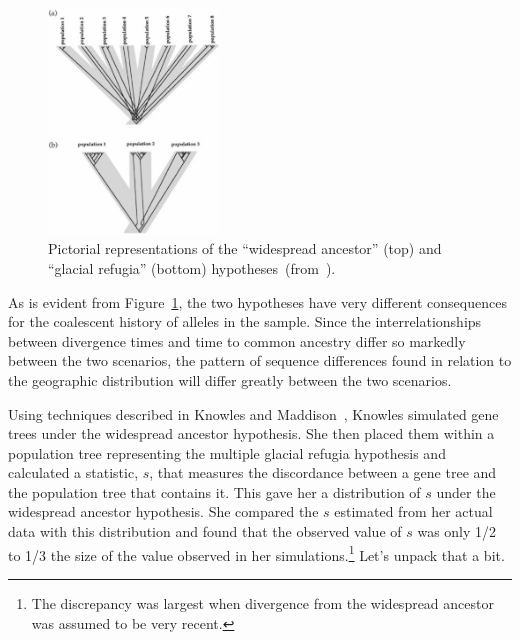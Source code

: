 \begin{figure}
\begin{center}
\includegraphics[height=6cm]{divergence-hypotheses.eps}
\end{center}
\caption{Pictorial representations of the ``widespread ancestor''
  (top) and ``glacial refugia'' (bottom)
  hypotheses~(from~\cite{Knowles-2001}).}\label{fig:divergence-hypotheses}
\end{figure}

As is evident from Figure~\ref{fig:divergence-hypotheses}, the two
hypotheses have very different consequences for the coalescent history
of alleles in the sample. Since the interrelationships between
divergence times and time to common ancestry differ so markedly
between the two scenarios, the pattern of sequence differences found
in relation to the geographic distribution will differ greatly between
the two scenarios. 

Using techniques described in Knowles and
Maddison~\cite{Knowles-Maddison-2002}, Knowles simulated gene trees
under the widespread ancestor hypothesis. She then placed them within
a population tree representing the multiple glacial refugia hypothesis
and calculated a statistic, $s$, that measures the discordance between
a gene tree and the population tree that contains it. This gave her a
distribution of $s$ under the widespread ancestor hypothesis. She
compared the $s$ estimated from her actual data with this distribution
and found that the observed value of $s$ was only 1/2 to 1/3 the size
of the value observed in her simulations.\footnote{The discrepancy was
  largest when divergence from the widespread ancestor was assumed to
  be very recent.} Let's unpack that a bit. 

